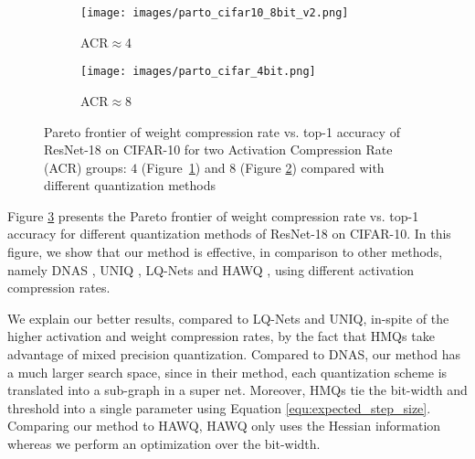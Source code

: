 \documentclass{article}
\newcommand{\qb}{HMQ}
\begin{document}
\begin{figure}[h]
	
	\begin{subfigure}{.48\textwidth}
		\centering
		\texttt{[image: images/parto\_cifar10\_8bit\_v2.png]}
		\caption{
			ACR$\approx$4
		}
		\label{fig:cifar10_parto_8bit}
	\end{subfigure}
	\hfill
	\begin{subfigure}{.48\textwidth}
		\centering
		\texttt{[image: images/parto\_cifar\_4bit.png]}
		\caption{ACR$\approx$8}
		\label{fig:cifar10_parto_4bit}
	\end{subfigure}
	\caption{
		Pareto frontier of weight compression rate vs. top-1 accuracy of ResNet-18 on CIFAR-10 for two Activation Compression Rate (ACR) groups: $4$ \mbox{(Figure \ref{fig:cifar10_parto_8bit})} and 8 (Figure \ref{fig:cifar10_parto_4bit}) compared with different quantization methods
	}
	\label{fig:cifar10resnet-18} 
\end{figure}

Figure \ref{fig:cifar10resnet-18} presents the Pareto frontier of weight compression rate vs. top-1 accuracy for different quantization methods of ResNet-18 on CIFAR-10. 
In this figure, we show that our method is effective, in comparison to other methods, namely DNAS \cite{wu2018mixed}, UNIQ \cite{baskin2018uniq}, LQ-Nets \cite{zhang2018lq} and HAWQ \cite{dong2019hawq}, using different activation compression rates.

We explain our better results, compared to LQ-Nets and UNIQ, in-spite of the higher activation and weight compression rates, by the fact that \qb s take advantage of mixed precision quantization.
Compared to DNAS, our method has a much larger search space, since in their method, each quantization scheme is translated into a sub-graph in a super net. 
Moreover, \qb s tie the bit-width and threshold into a single parameter using Equation \ref{equ:expected_step_size}.
Comparing our method to HAWQ, HAWQ only uses the Hessian information whereas we perform an optimization over the bit-width.
\end{document}
